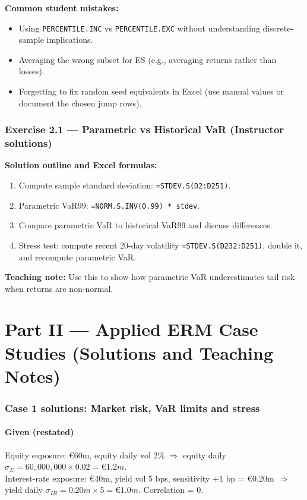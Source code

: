 \documentclass[11pt]{article}
\begin{document}
\textbf{Common student mistakes:}
\begin{itemize}
  \item Using \texttt{PERCENTILE.INC} vs \texttt{PERCENTILE.EXC} without understanding discrete-sample implications.
  \item Averaging the wrong subset for ES (e.g., averaging returns rather than losses).
  \item Forgetting to fix random seed equivalents in Excel (use manual values or document the chosen jump rows).
\end{itemize}

\newpage
\section{Exercise 2.1 --- Parametric vs Historical VaR (Instructor solutions)}
\textbf{Solution outline and Excel formulas:}
\begin{enumerate}
  \item Compute sample standard deviation: \texttt{=STDEV.S(D2:D251)}.
  \item Parametric VaR99: \texttt{=NORM.S.INV(0.99) * stdev}.
  \item Compare parametric VaR to historical VaR99 and discuss differences.
  \item Stress test: compute recent 20-day volatility \texttt{=STDEV.S(D232:D251)}, double it, and recompute parametric VaR.
\end{enumerate}

\textbf{Teaching note:} Use this to show how parametric VaR underestimates tail risk when returns are non-normal.

\newpage
\part*{Part II --- Applied ERM Case Studies (Solutions and Teaching Notes)}

\section{Case 1 solutions: Market risk, VaR limits and stress}
\subsection*{Given (restated)}
Equity exposure: \euro 60m, equity daily vol 2\% $\Rightarrow$ equity daily $\sigma_E = 60{,}000{,}000 \times 0.02 = \euro 1.2m$. \\
Interest-rate exposure: \euro 40m, yield vol 5 bps, sensitivity +1 bp = \euro 0.20m $\Rightarrow$ yield daily $\sigma_{IR} = 0.20m \times 5 = \euro 1.0m$. Correlation = 0.
\end{document}
